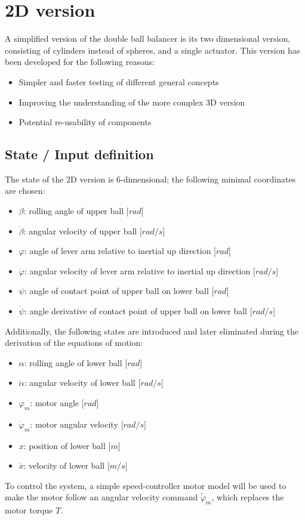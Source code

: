 \documentclass{article}
\begin{document}
\section{2D version}
A simplified version of the double ball balancer is its two dimensional version, consisting of cylinders instead of spheres, and a single actuator.
This version has been developed for the following reasons:
\begin{itemize}
	\item Simpler and faster testing of different general concepts
	\item Improving the understanding of the more complex 3D version
	\item Potential re-usability of components
\end{itemize}

\subsection{State / Input definition}
The state of the 2D version is 6-dimensional; the following minimal coordinates are chosen:
\begin{itemize}
	\item $\beta$: rolling angle of upper ball [$rad$]
	\item $\dot{\beta}$: angular velocity of upper ball [$rad/s$]
	\item $\varphi$: angle of lever arm relative to inertial up direction [$rad$]
	\item $\dot{\varphi}$: angular velocity of lever arm relative to inertial up direction [$rad/s$]
	\item $\psi$: angle of contact point of upper ball on lower ball [$rad$]
	\item $\dot{\psi}$: angle derivative of contact point of upper ball on lower ball [$rad/s$]
\end{itemize}
Additionally, the following states are introduced and later eliminated during the derivation of the equations of motion:
\begin{itemize}
	\item $\alpha$: rolling angle of lower ball [$rad$]
	\item $\dot{\alpha}$: angular velocity of lower ball [$rad/s$]
	\item $\varphi_m$: motor angle [$rad$]
	\item $\dot{\varphi}_m$: motor angular velocity [$rad/s$]
	\item $x$: position of lower ball [$m$]
	\item $\dot{x}$: velocity  of lower ball [$m/s$]
\end{itemize}
To control the system, a simple speed-controller motor model will be used to make the motor follow an angular velocity command $\breve{\dot{\varphi}}_m$, which replaces the motor torque $T$.
\end{document}
